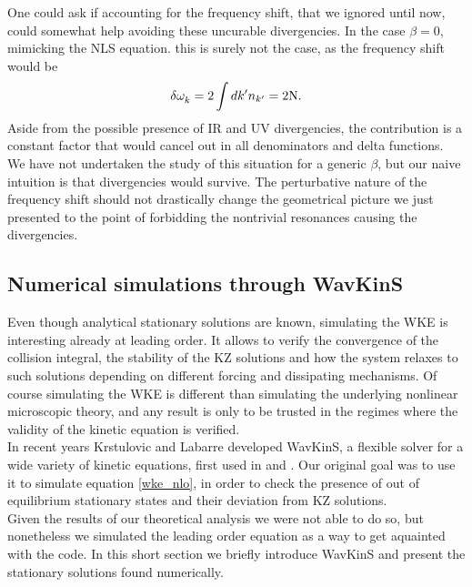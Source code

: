     One could ask if accounting for the frequency shift, that we ignored until now, could somewhat help avoiding these uncurable divergencies. In the case
    $\beta = 0$, mimicking the NLS equation. this is surely not the case, as the frequency shift would be
    \begin{equation}
        \delta \omega^{}_k = 2\int dk' n_{k'} = 2 \mathrm{N}. 
    \end{equation}
    Aside from the possible presence of IR and UV divergencies, the contribution is a constant factor that would cancel out in all denominators and delta functions.\\
    We have not undertaken the study of this situation for a generic $\beta$, but our naive intuition is that divergencies would survive. The perturbative nature of the frequency shift should not drastically change the geometrical picture we just presented to the point of forbidding the nontrivial resonances causing the divergencies.\\
    \subsection{Numerical simulations through WavKinS}

    Even though analytical stationary solutions are known, simulating the WKE is interesting already at leading order. It allows to verify the convergence of the collision integral, the stability of the KZ solutions and how the system relaxes to such solutions depending on different forcing and dissipating mechanisms. Of course simulating the WKE is different than simulating the underlying nonlinear microscopic theory, and any result is only to be trusted in the regimes where the validity of the kinetic equation is verified. \\

    In recent years Krstulovic and Labarre developed WavKinS, a flexible solver for a wide variety of kinetic equations, first used in \cite{Giorgio1} and \cite{Giorgio2}. Our original goal was to use it to 
    simulate equation \eqref{wke_nlo}, in order to check the presence of out of equilibrium stationary states and their deviation from KZ solutions.\\
    Given the results of our theoretical analysis we were not able to do so, but nonetheless we simulated the leading order equation as a way to get aquainted with the code. In this short section we briefly introduce WavKinS and present the stationary solutions found numerically. \\
    

